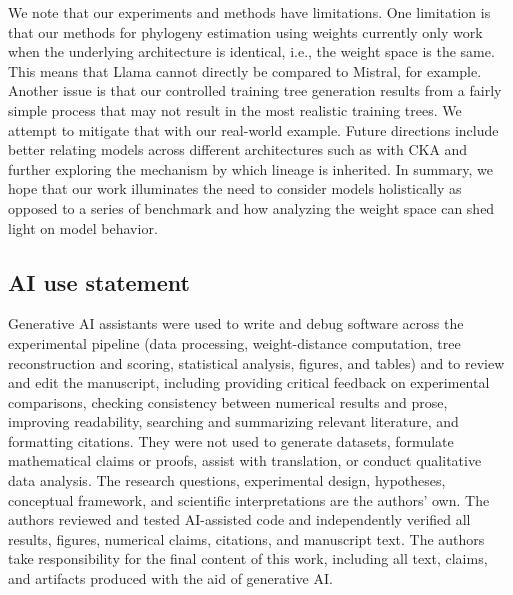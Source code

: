 \documentclass{article}
\theoremstyle{definition}
\theoremstyle{plain}
\begin{document}
We note that our experiments and methods have limitations.  One limitation is that our methods for phylogeny estimation using weights currently only work when the underlying architecture is identical, i.e., the weight space is the same.  This means that Llama cannot directly be compared to Mistral, for example. Another issue is that our controlled training tree generation results from a fairly simple process that may not result in the most realistic training trees.  We attempt to mitigate that with our real-world example. Future directions include better relating models across different architectures such as with CKA and further exploring the mechanism by which lineage is inherited. In summary, we hope that our work illuminates the need to consider models holistically as opposed to a series of benchmark and how analyzing the weight space can shed light on model behavior.



\subsection*{AI use statement}
Generative AI assistants were used to write and debug software across the experimental
pipeline (data processing, weight-distance computation, tree reconstruction and scoring, statistical
analysis, figures, and tables) and to review and edit the manuscript, including providing critical
feedback on experimental comparisons, checking consistency between numerical results and prose,
improving readability, searching and summarizing relevant literature, and formatting citations. They
were not used to generate datasets, formulate mathematical claims or proofs, assist with translation,
or conduct qualitative data analysis. The research questions, experimental design,
hypotheses, conceptual framework, and scientific interpretations are the authors' own. The authors
reviewed and tested AI-assisted code and independently verified all results, figures, numerical claims,
citations, and manuscript text. The authors take responsibility for the final content of this work,
including all text, claims, and artifacts produced with the aid of generative AI.





\appendix
\end{document}

